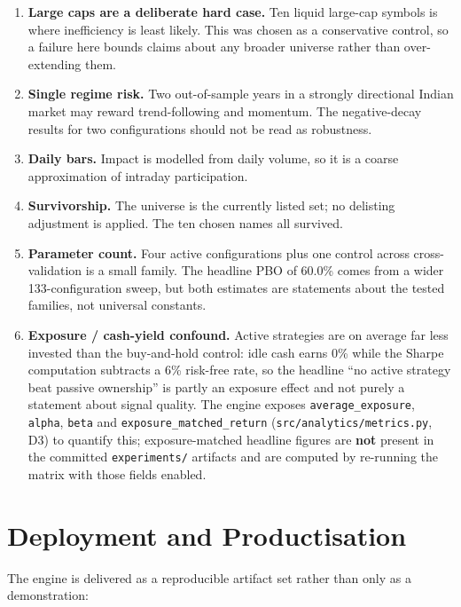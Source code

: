 \documentclass[12pt,a4paper,oneside]{report}
\begin{document}
\begin{enumerate}[leftmargin=1.5cm]
    \item \textbf{Large caps are a deliberate hard case.} Ten liquid large-cap
    symbols is where inefficiency is least likely. This was chosen as a
    conservative control, so a failure here bounds claims about any broader
    universe rather than over-extending them.
    \item \textbf{Single regime risk.} Two out-of-sample years in a strongly
    directional Indian market may reward trend-following and momentum. The
    negative-decay results for two configurations should not be read as
    robustness.
    \item \textbf{Daily bars.} Impact is modelled from daily volume, so it is a
    coarse approximation of intraday participation.
    \item \textbf{Survivorship.} The universe is the currently listed set; no
    delisting adjustment is applied. The ten chosen names all survived.
    \item \textbf{Parameter count.} Four active configurations plus one control
    across cross-validation is a small family. The headline PBO of 60.0\% comes
    from a wider 133-configuration sweep, but both estimates are statements about
    the tested families, not universal constants.
    \item \textbf{Exposure / cash-yield confound.} Active strategies are on
    average far less invested than the buy-and-hold control: idle cash earns
    0\% while the Sharpe computation subtracts a 6\% risk-free rate, so the
    headline ``no active strategy beat passive ownership'' is partly an exposure
    effect and not purely a statement about signal quality. The engine exposes
    \texttt{average\_exposure}, \texttt{alpha}, \texttt{beta} and
    \texttt{exposure\_matched\_return} (\texttt{src/analytics/metrics.py},
    D3) to quantify this; exposure-matched headline figures are \textbf{not}
    present in the committed \texttt{experiments/} artifacts and are computed by
    re-running the matrix with those fields enabled.
\end{enumerate}

\section{Deployment and Productisation}

The engine is delivered as a reproducible artifact set rather than only as a
demonstration:
\end{document}
